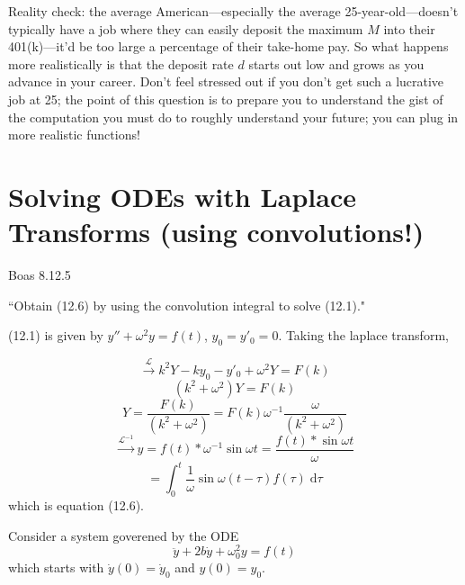 \documentclass[answers]{exam}\newcommand{\repositoryInformationSetup}{     \usepackage[dvipsnames]{xcolor}     \usepackage[ angle=90, color=black, opacity=1, scale=2, ]{background}      \SetBgPosition{current page.west}      \SetBgVshift{-4.5mm}      \backgroundsetup{contents={{\color{green}\texttt{-{}-} differs from commit \texttt{40a9b87} in 0 files}}} } \newcommand{\commit}{{{\color{green}40a9b87}}}\usepackage{amsmath}
\providecommand{\id}{}
\renewcommand{\id}[1]{\ensuremath{\; \mathrm{d}#1}}
\begin{document}
\begin{questions}
	Reality check: the average American---especially the average 25-year-old---doesn't typically have a job where they can easily deposit the maximum $M$ into their 401(k)---it'd be too large a percentage of their take-home pay.
	So what happens more realistically is that the deposit rate $d$ starts out low and grows as you advance in your career.
	Don't feel stressed out if you don't get such a lucrative job at 25; the point of this question is to prepare you to understand the gist of the computation you must do to roughly understand your future; you can plug in more realistic functions!



	\section*{Solving ODEs with Laplace Transforms (using convolutions!)}
	\question Boas 8.12.5

	\begin{solution}
		``Obtain (12.6) by using the convolution integral to solve (12.1)."

		(12.1) is given by $y'' + \omega^2 y = f(t)$, $y_0 = y'_0 = 0$. Taking the laplace transform,

		$$ \stackrel{\mathcal{L}}{\rightarrow} k^2 Y - k y_0 - y'_0 + \omega^2 Y = F(k) $$
		$$ (k^2 + \omega^2) Y = F(k) $$
		$$ Y = \frac{F(k)}{(k^2 + \omega^2)} = F(k) \omega^{-1}  \frac{\omega}{(k^2 + \omega^2)}$$
		$$ \stackrel{\mathcal{L}^{-1}}{\rightarrow} y = f(t) \ast \omega^{-1} \sin \omega t = \frac{ f(t) \ast \sin \omega t }{\omega}$$
		$$ = \int_0^t \frac{1}{\omega} \sin \omega (t - \tau) f(\tau) \id{\tau}$$
		which is equation (12.6).

	\end{solution}

	\question Consider a system goverened by the ODE
	\begin{equation}
		\ddot{y} + 2b \dot{y} + \omega_0^2 y = f(t)
	\end{equation}
	which starts with $\dot{y}(0)=\dot{y}_0$ and $y(0)=y_0$.


\end{questions}
\end{document}
